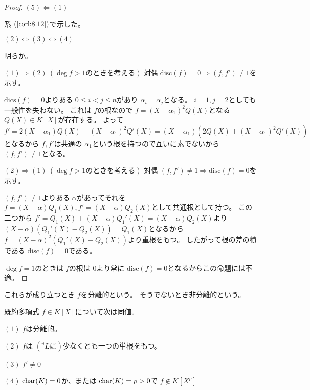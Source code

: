 \documentclass[../master_galois_theory]{subfiles}
\begin{document}
\begin{proof}
  $(5) \Leftrightarrow (1)$

  系 $(\mathrm{\ref{corl:8.12}})$で示した。

  $(2) \Leftrightarrow (3) \Leftrightarrow (4)$

  明らか。

  $(1) \Rightarrow (2) \  (\deg f > 1のときを考える)$
  対偶 $\mathrm{disc}(f) = 0 \Rightarrow (f,f') \neq 1$を示す。

  $\mathrm{dics}(f) = 0$よりある $0 \leq i < j \leq n$があり
  $\alpha_i = \alpha_j$となる。
  $i = 1 , j = 2$としても一般性を失わない。
  これは $f$の根なので $f = (X - \alpha_1)^2 Q(X)$となる $Q(X) \in K[X]$が存在する。
  よって $f' = 2(X - \alpha_1)Q(X) + (X - \alpha_1)^2 Q'(X) = (X - \alpha_1)(2 Q(X) + (X - \alpha_1)^2 Q'(X))$となるから
  $f , f'$は共通の $\alpha_1$という根を持つので互いに素でないから
  $(f,f') \neq 1$となる。

  $(2) \Rightarrow (1) \  (\deg f > 1のときを考える)$
  対偶 $(f,f') \neq 1 \Rightarrow \mathrm{disc}(f) = 0$を示す。

  $(f,f') \neq 1$よりある $\alpha$があってそれを
  $f = (X - \alpha) Q_1(X) , f' = (X - \alpha) Q_2(X)$として共通根として持つ。
  この二つから $f' = Q_1(X) + (X - \alpha)Q_1'(X) = (X - \alpha) Q_2(X)$より
  $(X - \alpha)(Q_1'(X) - Q_2(X)) = Q_1(X)$となるから
  $f = (X - \alpha)^2 (Q_1'(X) - Q_2(X))$より重根をもつ。
  したがって根の差の積である $\mathrm{disc}(f) = 0$である。

  $\deg f = 1$のときは $f$の根は $0$より常に $\mathrm{disc}(f) = 0$となるからこの命題には不適。
\end{proof}

\begin{defi}
  これらが成り立つとき $f$を\underline{分離的}という。
  そうでないとき非分離的という。
\end{defi}

\begin{prop} \label{prop:9.3}
  既約多項式 $f \in K[X]$について次は同値。

  $(1)$
  $f$は分離的。

  $(2)$
  $f$は $({}^\exists L に)$少なくとも一つの単根をもつ。

  $(3)$
  $f' \neq 0$

  $(4)$
  $\mathrm{char}(K) = 0$か、または $\mathrm{char}(K) = p > 0$で $f \notin K[X^p]$
\end{prop}
\end{document}
